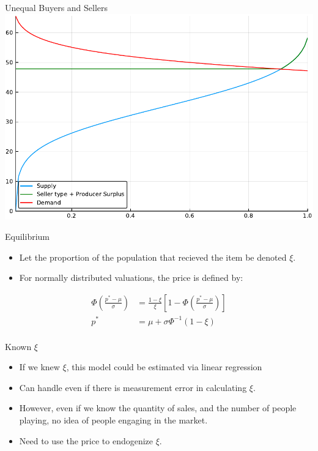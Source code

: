 \documentclass[bigger]{beamer}
\begin{document}
\begin{frame}[label=sec-1-8]{Unequal Buyers and Sellers}
\includegraphics[width=.9\linewidth]{../Scripts/oneTenth.pdf}
\end{frame}

\begin{frame}[label=sec-1-9]{Equilibrium}
\begin{itemize}
\item Let the proportion of the population that recieved the item be
denoted $\xi$.
\item For normally distributed valuations, the price is defined by:
\end{itemize}

\begin{align*}
\Phi \left ( \frac{ p^* - \mu }{\sigma} \right ) &= \frac{1-\xi}{\xi} \left [ 1 - \Phi \left
( \frac{ p^* - \mu }{\sigma} \right ) \right ]\\
p^* &= \mu + \sigma \Phi^{-1} ( 1- \xi )\\
\end{align*}
\end{frame}


\begin{frame}[label=sec-1-10]{Known $\xi$}
\begin{itemize}
\item If we knew $\xi$, this model could be estimated via linear regression
\item Can handle even if there is measurement error in calculating $\xi$.
\item However, even if we know the quantity of sales, and the number of
people playing, no idea of people engaging in the market.
\item Need to use the price to endogenize $\xi$.
\end{itemize}
\end{frame}
\end{document}
